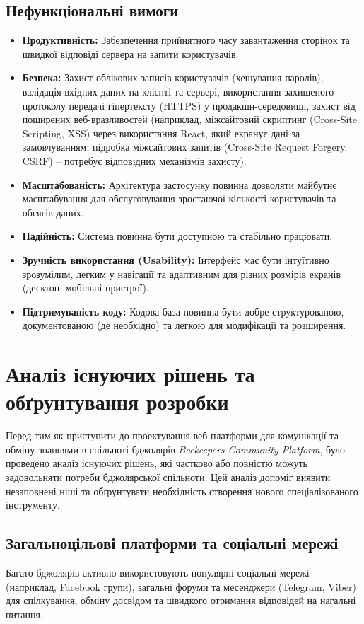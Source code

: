 \subsection{Нефункціональні вимоги}
\begin{itemize}
    \item \textbf{Продуктивність:} Забезпечення прийнятного часу завантаження сторінок та швидкої відповіді сервера на запити користувачів.
    \item \textbf{Безпека:} Захист облікових записів користувачів (хешування паролів), валідація вхідних даних на клієнті та сервері, використання захищеного протоколу передачі гіпертексту (HTTPS) у продакшн-середовищі, захист від поширених веб-вразливостей (наприклад, міжсайтовий скриптинг (Cross-Site Scripting, XSS) через використання React, який екранує дані за замовчуванням; підробка міжсайтових запитів (Cross-Site Request Forgery, CSRF) – потребує відповідних механізмів захисту).
    \item \textbf{Масштабованість:} Архітектура застосунку повинна дозволяти майбутнє масштабування для обслуговування зростаючої кількості користувачів та обсягів даних.
    \item \textbf{Надійність:} Система повинна бути доступною та стабільно працювати.
    \item \textbf{Зручність використання (Usability):} Інтерфейс має бути інтуїтивно зрозумілим, легким у навігації та адаптивним для різних розмірів екранів (десктоп, мобільні пристрої).
    \item \textbf{Підтримуваність коду:} Кодова база повинна бути добре структурованою, документованою (де необхідно) та легкою для модифікації та розширення.
\end{itemize}

\section{Аналіз існуючих рішень та обґрунтування розробки}
\label{sec:existing_solutions}
Перед тим як приступити до проектування веб-платформи для комунікації та обміну знаннями в спільноті бджолярів \textit{Beekeepers Community Platform}, було проведено аналіз існуючих рішень, які частково або повністю можуть задовольняти потреби бджолярської спільноти. Цей аналіз допоміг виявити незаповнені ніші та обґрунтувати необхідність створення нового спеціалізованого інструменту.

\subsection{Загальноцільові платформи та соціальні мережі}
Багато бджолярів активно використовують популярні соціальні мережі (наприклад, Facebook групи), загальні форуми та месенджери (Telegram, Viber) для спілкування, обміну досвідом та швидкого отримання відповідей на нагальні питання. 


